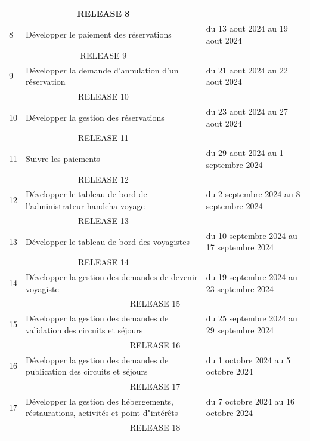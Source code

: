 \documentclass[12pt]{report}
\begin{document}
\begin{longtable}{|p{1cm}|p{7cm}|p{6cm}|}
						\hline
						\multicolumn{2}{|c|}{RELEASE 8}\\
						\hline
						8 & Développer le paiement des réservations & du 13 aout 2024 au 19 aout 2024\\
						\hline
						\multicolumn{2}{|c|}{RELEASE 9}\\
						\hline
						9 & Développer la demande d'annulation d'un réservation &du 21 aout 2024 au 22 aout 2024\\
						\hline
						\multicolumn{2}{|c|}{RELEASE 10}\\
						\hline
						10 & Développer la gestion des réservations &du 23 aout 2024 au 27 aout 2024\\
						\hline
						\multicolumn{2}{|c|}{RELEASE 11}\\
						\hline
						11 & Suivre les paiements & du 29 aout 2024 au 1 septembre 2024\\				
						\hline
						\multicolumn{2}{|c|}{RELEASE 12}\\
						\hline
						12 & Développer le tableau de bord de l'administrateur handeha voyage& du 2 septembre 2024 au 8 septembre 2024\\
						\hline
						\multicolumn{2}{|c|}{RELEASE 13}\\
						\hline
						13 & Développer le tableau de bord des voyagistes & du 10 septembre 2024 au 17 septembre 2024\\
						\hline
						\multicolumn{2}{|c|}{RELEASE 14}\\
						\hline
						14 & Développer la gestion des demandes de devenir voyagiste & du 19 septembre 2024 au 23 septembre 2024\\
						\hline
						\multicolumn{3}{|c|}{RELEASE 15}\\
						\hline
						15 & Développer la gestion des demandes de validation des circuits et séjours & du 25 septembre 2024 au 29 septembre 2024\\
						\hline
						\multicolumn{3}{|c|}{RELEASE 16}\\
						\hline
						16 & Développer la gestion des demandes de publication des circuits et séjours & du 1 octobre 2024 au 5 octobre 2024\\
						\hline
						\multicolumn{3}{|c|}{RELEASE 17}\\
						\hline
						17 & Développer la gestion des hébergements, réstaurations, activités et point d"intérêts & du 7 octobre 2024 au 16 octobre 2024\\
						\hline
						\multicolumn{3}{|c|}{RELEASE 18}\\

\end{longtable}
\end{document}
